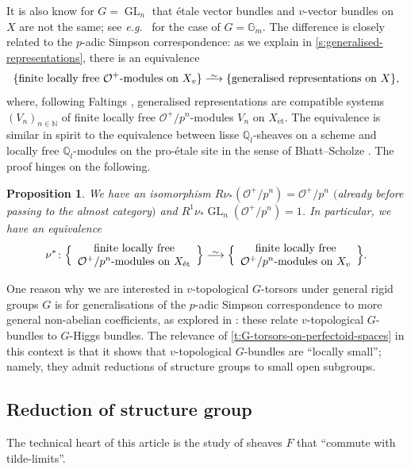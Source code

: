 \documentclass[11pt]{amsart}
\numberwithin{equation}{section}
\newtheorem{Proposition}[thm]{Proposition}
\theoremstyle{definition}
\theoremstyle{remark}
\newcommand{\lra}{\longrightarrow}
\newcommand*{\lowsim}{\vbox to 0pt{\vss\hbox{$\scriptstyle\sim$}\vskip-2pt}}
\newcommand*{\longisomarrow}{\stackrel{\lowsim}{\lra}}
\newcommand{\G}{\mathbb{G}}
\newcommand{\N}{\mathbb{N}}
\renewcommand{\O}{\mathcal{O}}
\newcommand{\Q}{\mathbb{Q}}
\newcommand{\GL}{\operatorname{GL}}
\newcommand{\et}{{\operatorname{\acute{e}t}}}
\begin{document}
It is also know for $G=\GL_n$ that \'etale vector bundles and $v$-vector bundles on $X$ are not the same; see \textit{e.g.}~\cite{heuer-v_lb_rigid} for the case of $G=\G_m$. The difference is closely related to the $p$-adic Simpson correspondence: as we explain in \cref{s:generalised-representations}, there is an equivalence
\[ \{ \text{finite locally free $\O^+$-modules on $X_{v}$}\}\longisomarrow \{\text{generalised representations on $X$}\},\]
where, following Faltings \cite{Faltings_SimpsonI}, generalised representations are compatible systems $(V_n)_{n\in \N}$ of  finite locally free  $\O^+/p^n$-modules $V_n$ on $X_{\et}$. The equivalence is similar in spirit to the equivalence between lisse $\Q_l$-sheaves on a scheme and locally free $\Q_l$-modules on the pro-\'etale site in the sense of Bhatt--Scholze \cite[Section~1]{bhatt-scholze-proetale}. The proof hinges on the following. 

\begin{Proposition}
	We have an isomorphism $R\nu_{\ast}(\O^+/p^n)=\O^+/p^n$ $($already before passing to the almost category$)$ and $R^1\nu_{\ast}\GL_n(\O^+/p^n)=1$. In particular, we have an equivalence
\[\nu^{\ast}\colon \Big\{ \begin{array}{c}\text{finite locally free}\\\text{$\O^+/p^n$-modules on $X_\et$}\end{array}\Big\}\longisomarrow \Big\{ \begin{array}{c}\text{finite locally free}\\\text{$\O^+/p^n$-modules on $X_v$}\end{array}\Big\}.\]
\end{Proposition}

One reason why we are interested in $v$-topological $G$-torsors under general rigid groups $G$ is for generalisations of the $p$-adic Simpson correspondence to more general non-abelian coefficients, as explored in \cite{heuer-sheafified-paCS}: these relate $v$-topological $G$-bundles to $G$-Higgs bundles. The relevance of \cref{t:G-torsors-on-perfectoid-spaces} in this context is that it shows that $v$-topological $G$-bundles are ``locally small''; namely, they admit reductions of structure groups to small open subgroups.

\subsection{Reduction of structure group}
The technical heart of this article is the study of sheaves $F$ that ``commute with tilde-limits''. 
\end{document}
